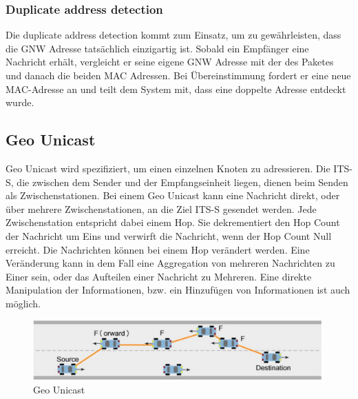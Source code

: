 \subsubsection{Duplicate address detection}
Die duplicate address detection kommt zum Einsatz, um zu gewährleisten, dass die \acl{GNW} Adresse tatsächlich einzigartig ist. Sobald ein Empfänger eine Nachricht erhält, vergleicht er seine eigene \acl{GNW} Adresse mit der des Paketes und danach die beiden MAC Adressen. Bei Übereinstimmung fordert er eine neue MAC-Adresse an und teilt dem System mit, dass eine doppelte Adresse entdeckt wurde. \cite{etsi302636-4-1}

\subsection{Geo Unicast}
Geo Unicast wird spezifiziert, um einen einzelnen Knoten zu adressieren. Die \ac{ITS-S}, die zwischen dem Sender und der Empfangseinheit liegen, dienen beim Senden als Zwischenstationen. Bei einem Geo Unicast kann eine Nachricht direkt, oder über mehrere Zwischenstationen, an die Ziel \ac{ITS-S} gesendet werden. Jede Zwischenstation entspricht dabei einem Hop. Sie dekrementiert den Hop Count der Nachricht um Eins und verwirft die Nachricht, wenn der Hop Count Null erreicht. Die Nachrichten können bei einem Hop verändert werden. Eine Veränderung kann in dem Fall eine Aggregation von mehreren Nachrichten zu Einer sein, oder das Aufteilen einer Nachricht zu Mehreren. Eine direkte Manipulation der Informationen, bzw. ein Hinzufügen von Informationen ist auch möglich.


\begin{figure}
	\includegraphics[width=0.99\textwidth]{content/images/03_networklayer/GeoUnicast.png}
	\caption{Geo Unicast \cite{etsi102636-1}}
	\label{fig:geounicast}
\end{figure}


